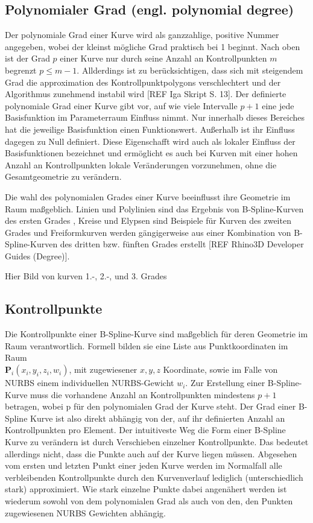 \documentclass[german,a4paper,12pt,oneside]{scrbook}
\theoremstyle{definition}
\theoremstyle{definition}
\theoremstyle{definition}
\theoremstyle{definition}
\theoremstyle{definition}
\theoremstyle{definition}
\begin{document}
\subsection{Polynomialer Grad (engl. polynomial degree)}
Der polynomiale Grad einer Kurve wird als ganzzahlige, positive Nummer angegeben, wobei der kleinst mögliche Grad praktisch bei 1 beginnt. Nach oben ist der Grad $p$ einer Kurve nur durch seine Anzahl an Kontrollpunkten $m$ begrenzt $p \leq m - 1$. Allderdings ist zu berücksichtigen, dass sich mit steigendem Grad die approximation des Kontrollpunktpolygons verschlechtert und der Algorithmus zunehmend instabil wird [REF Iga Skript S. 13]. Der definierte polynomiale Grad einer Kurve gibt vor, auf wie viele Intervalle $p+1$ eine jede Basisfunktion im Parameterraum Einfluss nimmt. Nur innerhalb dieses Bereiches hat die jeweilige Basisfunktion einen Funktionswert. Außerhalb ist ihr Einfluss dagegen zu Null definiert. Diese Eigenschafft wird auch als lokaler Einfluss der Basisfunktionen bezeichnet und ermöglicht es auch bei Kurven mit einer hohen Anzahl an Kontrollpunkten lokale Veränderungen vorzunehmen, ohne die Gesamtgeometrie zu verändern.

Die wahl des polynomialen Grades einer Kurve beeinflusst ihre Geometrie im Raum maßgeblich. Linien und Polylinien sind das Ergebnis von B-Spline-Kurven des ersten Grades , Kreise und Elypsen sind Beispiele für Kurven des zweiten Grades und Freiformkurven werden gängigerweise aus einer Kombination von B-Spline-Kurven des dritten bzw. fünften Grades erstellt [REF Rhino3D Developer Guides (Degree)].

\large
\vspace{1.5cm}
\hfil
Hier Bild von kurven 1.-, 2.-, und 3. Grades

\normalsize
\subsection{Kontrollpunkte}
Die Kontrollpunkte einer B-Spline-Kurve sind maßgeblich für deren Geometrie im Raum verantwortlich. Formell bilden sie eine Liste aus Punktkoordinaten im Raum \\ $\bm{P}_i(x_i, y_i, z_i, w_i)$, mit zugewiesener $x, y, z$ Koordinate, sowie im Falle von NURBS einem individuellen NURBS-Gewicht $w_i$. Zur Erstellung einer B-Spline-Kurve muss die vorhandene Anzahl an Kontrollpunkten mindestens $p+1$ betragen, wobei p für den polynomialen Grad der Kurve steht. Der Grad einer B-Spline Kurve ist also direkt abhängig von der, auf ihr definierten Anzahl an Kontrollpunkten pro Element. Der intuitiveste Weg die Form einer B-Spline Kurve zu verändern ist durch Verschieben einzelner Kontrollpunkte. Das bedeutet allerdings nicht, dass die Punkte auch auf der Kurve liegen müssen. Abgesehen vom ersten und letzten Punkt einer jeden Kurve werden im Normalfall alle verbleibenden Kontrollpunkte durch den Kurvenverlauf lediglich (unterschiedlich stark) approximiert. Wie stark einzelne Punkte dabei angenähert werden ist wiederum sowohl von dem polynomialen Grad als auch von den, den Punkten zugewiesenen NURBS Gewichten abhängig.
\end{document}
